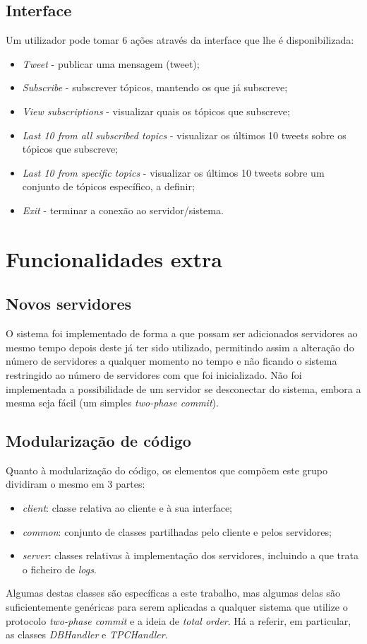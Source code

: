 \documentclass[a4paper]{report}
\begin{document}
		\subsection{Interface}
		Um utilizador pode tomar 6 ações através da interface que lhe é disponibilizada:
		\begin{itemize}
			\item \textit{Tweet} - publicar uma mensagem (tweet);
			\item \textit{Subscribe} - subscrever tópicos, mantendo os que já subscreve;
			\item \textit{View subscriptions} - visualizar quais os tópicos que subscreve;
			\item \textit{Last 10 from all subscribed topics} - visualizar os últimos 10 tweets sobre os tópicos que subscreve;
			\item \textit{Last 10 from specific topics} - visualizar os últimos 10 tweets sobre um conjunto de tópicos específico, a definir;
			\item \textit{Exit} - terminar a conexão ao servidor/sistema.
		\end{itemize}

	\section{Funcionalidades extra}
		\subsection{Novos servidores}

		O sistema foi implementado de forma a que possam ser adicionados servidores ao mesmo tempo depois deste já ter sido utilizado, 
		permitindo assim a alteração do número de servidores a qualquer momento no tempo e não ficando o sistema restringido ao número de servidores com que foi inicializado.
		Não foi implementada a possibilidade de um servidor se desconectar do sistema, embora a mesma seja fácil (um simples \textit{two-phase commit}).

		\subsection{Modularização de código}
		
		Quanto à modularização do código, os elementos que compõem este grupo dividiram o mesmo em 3 partes:
		\begin{itemize}
			\item \textit{client}: classe relativa ao cliente e à sua interface;
			\item \textit{common}: conjunto de classes partilhadas pelo cliente e pelos servidores;
			\item \textit{server}: classes relativas à implementação dos servidores, incluindo a que trata o ficheiro de \textit{logs}.
		\end{itemize}
		Algumas destas classes são específicas a este trabalho, mas algumas delas são suficientemente genéricas para serem aplicadas a qualquer sistema que utilize o protocolo \textit{two-phase commit} e a ideia de \textit{total order}. Há a referir, em particular, as classes \textit{DBHandler} e \textit{TPCHandler}.
\end{document}
